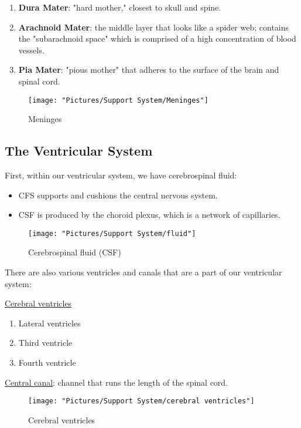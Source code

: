\documentclass[12pt,a4paper]{article}
\begin{document}
	\begin{enumerate}
		\item \textbf{Dura Mater}: "hard mother," closest to skull and spine. 
		\item \textbf{Arachnoid Mater}: the middle layer that looks like a spider web; contains the "subarachnoid space" which is comprised of a high concentration of blood vessels. 
		\item \textbf{Pia Mater}: "pious mother" that adheres to the surface of the brain and spinal cord. 
	\end{enumerate}
	
	
\begin{figure}
	\centering
	\texttt{[image: "Pictures/Support System/Meninges"]}
	\caption{Meninges}
	\label{fig:meninges}
\end{figure}
	
	\subsection{The Ventricular System}
	
	First, within our ventricular system, we have cerebrospinal fluid: 
	\begin{itemize}
		\item CFS supports and cushions the central nervous system. 
		\item CSF is produced by the choroid plexus, which is a network of capillaries. 
	\end{itemize}
	
	
\begin{figure}
	\centering
	\texttt{[image: "Pictures/Support System/fluid"]}
	\caption{Cerebrospinal fluid (CSF)}
	\label{fig:fluid}
\end{figure}
	
	There are also various ventricles and canals that are a part of our ventricular system: 
	
	\underline{Cerebral ventricles}
	\begin{enumerate}
		\item Lateral ventricles 
		\item Third ventricle 
		\item Fourth ventricle 
	\end{enumerate}
	
	\underline{Central canal}: channel that runs the length of the spinal cord.
	
	 
\begin{figure}
	\centering
	\texttt{[image: "Pictures/Support System/cerebral ventricles"]}
	\caption{Cerebral ventricles}
	\label{fig:cerebral-ventricles}
\end{figure}
	
\end{document}

